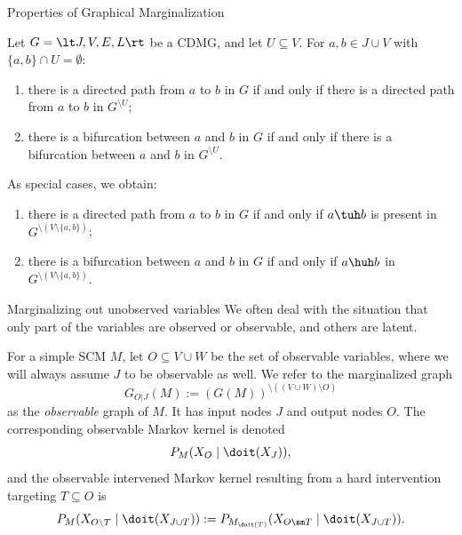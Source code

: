 \begin{frame}{Properties of Graphical Marginalization}
\begin{Prp}
  Let $G = \lt J, V, E, L \rt$ be a CDMG, and let $U \subseteq V$. For $a,b \in J \cup V$ with $\{a,b\} \cap U = \emptyset$:
\begin{enumerate}
  \item {\color{gray}there is a directed path from $a$ to $b$ in $G$ if and only if there is a directed path from $a$ to $b$ in $G^{\setminus U}$};
  \item there is a bifurcation between $a$ and $b$ in $G$ if and only if there is a bifurcation between $a$ and $b$ in $G^{\setminus U}$.
\end{enumerate}
\end{Prp}
\begin{Rem}
  As special cases, we obtain:
    \begin{enumerate}
      \item there is a directed path from $a$ to $b$ in $G$ if and only if $a \tuh b$ is present in $G^{\setminus (V\setminus\{a,b\})}$;
      \item there is a bifurcation between $a$ and $b$ in $G$ if and only if $a \huh b$ in $G^{\setminus (V\setminus\{a,b\})}$.
    \end{enumerate}
\end{Rem}
\end{frame}

\begin{frame}{Marginalizing out unobserved variables}
We often deal with the situation that only part of the variables are observed or observable, and others are latent.
\begin{Not}
\setlength\abovedisplayskip{5pt}
\setlength\belowdisplayskip{5pt}
For a simple SCM $M$, let $O \subseteq V \cup W$ be the set of observable variables,
where we will always assume $J$ to be observable as well.
We refer to the marginalized graph
$$G_{O|J}(M) := (G(M))^{\setminus((V \cup W) \setminus O)}$$
as the \emph{observable} graph of $M$. It has input nodes $J$ and output nodes $O$.
The corresponding observable Markov kernel is denoted 
  $$P_{M}(X_O \mid \doit(X_J)),$$
and the observable intervened Markov kernel resulting from a hard intervention targeting $T \subseteq O$ is 
  $$P_{M}(X_{O\setminus T} \mid \doit(X_{J\cup T})) := P_{M_{\doit(T)}}(X_{O\sm T} \mid \doit(X_{J\cup T})).$$
\end{Not}
\end{frame}

